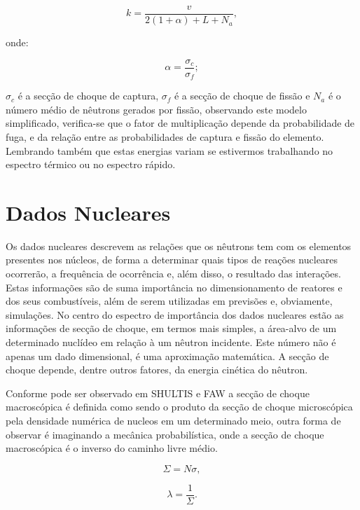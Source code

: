 \documentclass[
	12pt,				%
	openany,			%
	twoside,			%
	a4paper,			%
	english,			%
	french,				%
	spanish,			%
	brazil				%
	]{abntex2}
\begin{document}
\begin{equation}
k=\frac{v}{2(1+\alpha)+L+N_{a}},
\end{equation}

onde:

\begin{equation}
\alpha=\frac{\sigma_{c}}{\sigma_{f}};
\end{equation}

$\sigma_{c}$ é a secção de choque de captura, $\sigma_{f}$ é a secção de choque de fissão e $N_{a}$ é o número médio de nêutrons gerados por fissão\cite[pag.~217]{21NIFNECKER}, observando este modelo simplificado, verifica-se que o fator de multiplicação depende da probabilidade de fuga, e da relação entre as probabilidades de captura e fissão do elemento. Lembrando também que estas energias variam se estivermos trabalhando no espectro térmico ou no espectro rápido.

\section{Dados Nucleares}

Os dados nucleares descrevem as relações que os nêutrons tem com os elementos presentes nos núcleos, de forma a determinar quais tipos de reações nucleares ocorrerão, a frequência de ocorrência e, além disso, o resultado das interações. Estas informações são de suma importância no dimensionamento de reatores e dos seus combustíveis, além de serem utilizadas em previsões e, obviamente, simulações. No centro do espectro de importância dos dados nucleares estão as informações de secção de choque, em termos mais simples, a área-alvo de um determinado nuclídeo em relação à um nêutron incidente. Este número não é apenas um dado
dimensional, é uma aproximação matemática. A secção de choque depende, dentre outros fatores, da energia cinética do nêutron.

Conforme pode ser observado em SHULTIS e FAW a secção de choque macroscópica é definida como sendo o produto da secção de choque microscópica pela densidade numérica de nucleos em um determinado meio, outra forma de observar é imaginando a mecânica probabilística, onde a secção de choque macroscópica é o inverso do caminho livre médio\cite{10fundamentos}.

\begin{equation}
\Sigma=N\sigma,
\end{equation}

\begin{equation}
\lambda=\frac{1}{\Sigma}.
\end{equation}
\end{document}
